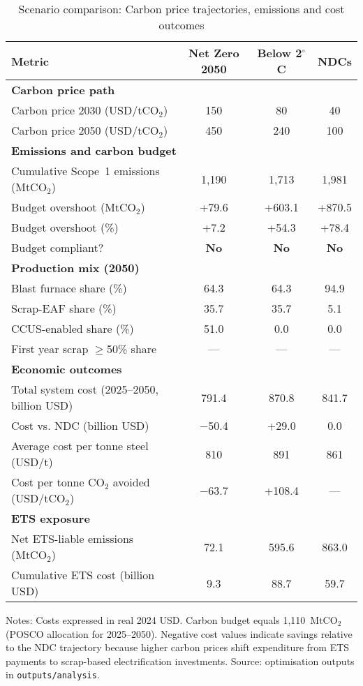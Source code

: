 \begin{table}[ht]
  \centering
  \caption{Scenario comparison: Carbon price trajectories, emissions and cost outcomes}
  \label{tab:scenario-comparison}
  \begin{threeparttable}
  \begin{tabular}{@{}lccc@{}}
    \toprule
    Metric & Net Zero 2050 & Below 2$^\circ$C & NDCs \\
    \midrule
    \multicolumn{4}{l}{\textbf{Carbon price path}} \\
    Carbon price 2030 (USD/tCO$_2$) & 150 & 80 & 40 \\
    Carbon price 2050 (USD/tCO$_2$) & 450 & 240 & 100 \\
    \midrule
    \multicolumn{4}{l}{\textbf{Emissions and carbon budget}} \\
    Cumulative Scope~1 emissions (MtCO$_2$) & 1{,}190 & 1{,}713 & 1{,}981 \\
    Budget overshoot (MtCO$_2$) & +79.6 & +603.1 & +870.5 \\
    Budget overshoot (\%) & +7.2 & +54.3 & +78.4 \\
    Budget compliant? & \textbf{No} & \textbf{No} & \textbf{No} \\
    \midrule
    \multicolumn{4}{l}{\textbf{Production mix (2050)}} \\
    Blast furnace share (\%) & 64.3 & 64.3 & 94.9 \\
    Scrap-EAF share (\%) & 35.7 & 35.7 & 5.1 \\
    CCUS-enabled share (\%) & 51.0 & 0.0 & 0.0 \\
    First year scrap $\ge$50\% share & --- & --- & --- \\
    \midrule
    \multicolumn{4}{l}{\textbf{Economic outcomes}} \\
    Total system cost (2025--2050, billion USD) & 791.4 & 870.8 & 841.7 \\
    Cost vs. NDC (billion USD) & $-$50.4 & +29.0 & 0.0 \\
    Average cost per tonne steel (USD/t) & 810 & 891 & 861 \\
    Cost per tonne CO$_2$ avoided (USD/tCO$_2$) & $-$63.7 & +108.4 & --- \\
    \midrule
    \multicolumn{4}{l}{\textbf{ETS exposure}} \\
    Net ETS-liable emissions (MtCO$_2$) & 72.1 & 595.6 & 863.0 \\
    Cumulative ETS cost (billion USD) & 9.3 & 88.7 & 59.7 \\
    \bottomrule
  \end{tabular}
  \begin{tablenotes}
    \footnotesize
    \item Notes: Costs expressed in real 2024 USD. Carbon budget equals 1{,}110~MtCO$_2$ (POSCO allocation for 2025--2050). Negative cost values indicate savings relative to the NDC trajectory because higher carbon prices shift expenditure from ETS payments to scrap-based electrification investments. Source: optimisation outputs in \texttt{outputs/analysis}.
  \end{tablenotes}
  \end{threeparttable}
\end{table}
